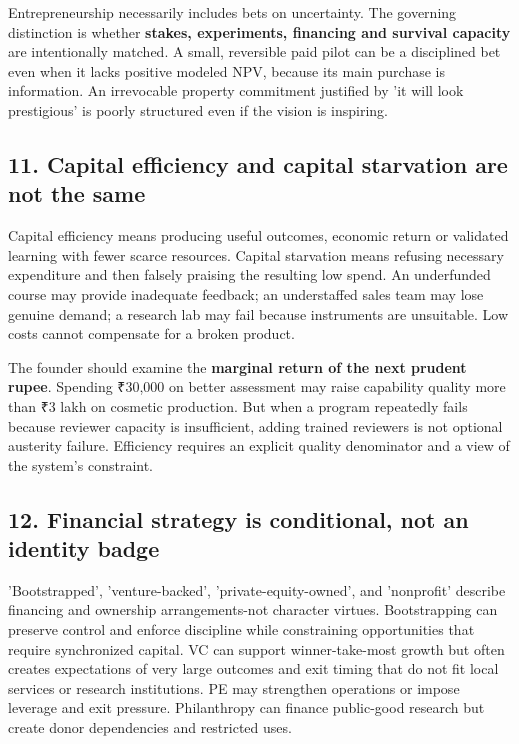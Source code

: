 Entrepreneurship necessarily includes bets on uncertainty. The governing distinction is whether \textbf{stakes, experiments, financing and survival capacity} are intentionally matched. A small, reversible paid pilot can be a disciplined bet even when it lacks positive modeled NPV, because its main purchase is information. An irrevocable property commitment justified by 'it will look prestigious' is poorly structured even if the vision is inspiring.

\subsection{11. Capital efficiency and capital starvation are not the same}


Capital efficiency means producing useful outcomes, economic return or validated learning with fewer scarce resources. Capital starvation means refusing necessary expenditure and then falsely praising the resulting low spend. An underfunded course may provide inadequate feedback; an understaffed sales team may lose genuine demand; a research lab may fail because instruments are unsuitable. Low costs cannot compensate for a broken product.

The founder should examine the \textbf{marginal return of the next prudent rupee}. Spending ₹30,000 on better assessment may raise capability quality more than ₹3 lakh on cosmetic production. But when a program repeatedly fails because reviewer capacity is insufficient, adding trained reviewers is not optional austerity failure. Efficiency requires an explicit quality denominator and a view of the system's constraint.

\subsection{12. Financial strategy is conditional, not an identity badge}


'Bootstrapped', 'venture-backed', 'private-equity-owned', and 'nonprofit' describe financing and ownership arrangements-not character virtues. Bootstrapping can preserve control and enforce discipline while constraining opportunities that require synchronized capital. VC can support winner-take-most growth but often creates expectations of very large outcomes and exit timing that do not fit local services or research institutions. PE may strengthen operations or impose leverage and exit pressure. Philanthropy can finance public-good research but create donor dependencies and restricted uses.

